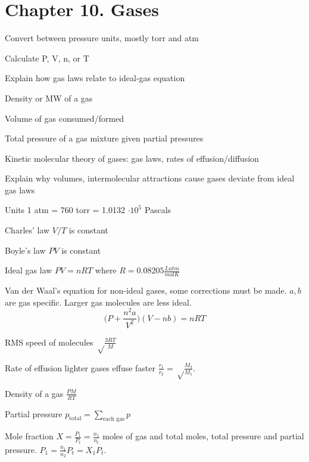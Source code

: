 \section{Chapter 10. Gases}

{\footnotesize
\begin{multicols}{3}
\begin{compactenum}
    \item Convert between pressure units, mostly torr and atm
    \item Calculate P, V, n, or T
    \item Explain how gas laws relate to ideal-gas equation
    \item Density or MW of a gas
    \item Volume of gas consumed/formed
    \item Total pressure of a gas mixture given partial pressures
    \item Kinetic molecular theory of gases: gas laws, rates of effusion/diffusion
    \item Explain why volumes, intermolecular attractions cause gases deviate
        from ideal gas laws
\end{compactenum}
\end{multicols}
}

\begin{mdframed}
\begin{multicols}{2}
\begin{compactdesc}
    \item[Units] 1 atm = 760 torr = 1.0132 $\cdot10^5$ Pascals
    \item[Charles' law] $V/T$ is constant
    \item[Boyle's law] $PV$ is constant
    \item[Ideal gas law] $PV = nRT$ where $R = 0.08205 \frac{Latm}{molK}$
    \item[Van der Waal's equation] for non-ideal gases, some corrections
        must be made.
        $a, b$ are gas specific. Larger gas molecules are less ideal.
        \[
            \Big(P + \frac{n^2a}{V^2} \Big)(V - nb) = nRT
        \]
    \item[RMS speed] of molecules $\sqrt \frac{3RT}{M}$
    \item[Rate of effusion] lighter gases effuse faster
        $\frac{r_1}{r_2} = \sqrt \frac{M_2}{M_1}$.
    \item[Density of a gas] $\frac{PM}{RT}$
    \item[Partial pressure] $p_\text{total} = \sum_\text{each gas} p$
    \item[Mole fraction] $X = \frac{P_1}{P_t} = \frac{n_1}{n_t}$ moles of gas
        and total moles, total pressure and partial pressure.
        $P_1 = \frac{n_1}{n_2} P_t = X_1 P_t$.
\end{compactdesc}
\end{multicols}
\end{mdframed}
